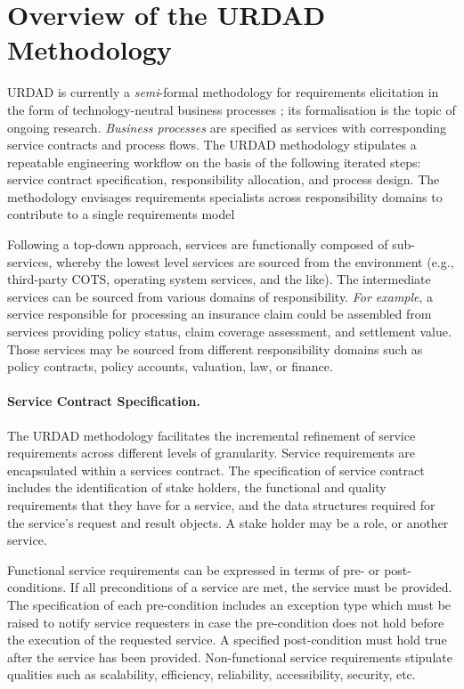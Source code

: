 \section{Overview of the URDAD Methodology 
\label{sec:urdadMethodology}}

URDAD is currently a \emph{semi}-formal methodology for requirements elicitation in the form of technology-neutral business processes \cite{solms_urdad_2010}; its formalisation is the topic of ongoing research. \emph{Business processes} are specified as services with corresponding service contracts and process flows. The URDAD methodology stipulates a repeatable engineering workflow on the basis of the following iterated steps: service contract specification, responsibility allocation, and process design. The methodology envisages requirements specialists across responsibility domains to contribute to a single requirements model
 
Following a top-down approach, services are functionally composed of sub-services, whereby the lowest level services are sourced from the environment (e.g., third-party COTS, operating system services, and the like). The intermediate services can be sourced from various domains of responsibility. \emph{For example}, a service responsible for processing an insurance claim could be assembled from services providing policy status, claim coverage assessment, and settlement value. Those services may be sourced from different responsibility domains such as policy contracts, policy accounts, valuation, law, or finance.

\paragraph{Service Contract Specification.} The URDAD methodology facilitates the incremental refinement of service requirements across different levels of granularity. Service requirements are encapsulated within a services contract. The specification of service contract includes the identification of stake holders, the functional and quality requirements that they have for a service, and the data structures required for the service's request and result objects. A stake holder may be a role, or another service.

Functional service requirements can be expressed in terms of pre- or post-conditions. If all preconditions of a service are met, the service must be provided. The specification of each pre-condition includes an exception type which must be raised to notify service requesters in case the pre-condition does not hold before the execution of the requested service. A specified post-condition must hold true after the service has been provided. Non-functional service requirements stipulate qualities such as scalability, efficiency, reliability, accessibility, security, etc.

